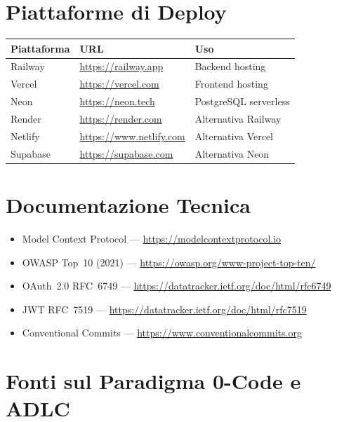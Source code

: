 \section{Piattaforme di Deploy}

\begin{center}
\begin{tabularx}{\textwidth}{l X l}
\toprule
\textbf{Piattaforma} & \textbf{URL} & \textbf{Uso} \\
\midrule
Railway & \url{https://railway.app} & Backend hosting \\
Vercel & \url{https://vercel.com} & Frontend hosting \\
Neon & \url{https://neon.tech} & PostgreSQL serverless \\
Render & \url{https://render.com} & Alternativa Railway \\
Netlify & \url{https://www.netlify.com} & Alternativa Vercel \\
Supabase & \url{https://supabase.com} & Alternativa Neon \\
\bottomrule
\end{tabularx}
\end{center}

\section{Documentazione Tecnica}

\begin{itemize}
  \item Model Context Protocol --- \url{https://modelcontextprotocol.io}
  \item OWASP Top~10 (2021) --- \url{https://owasp.org/www-project-top-ten/}
  \item OAuth~2.0 RFC~6749 --- \url{https://datatracker.ietf.org/doc/html/rfc6749}
  \item JWT RFC~7519 --- \url{https://datatracker.ietf.org/doc/html/rfc7519}
  \item Conventional Commits --- \url{https://www.conventionalcommits.org}
\end{itemize}

\section{Fonti sul Paradigma 0-Code e ADLC}

